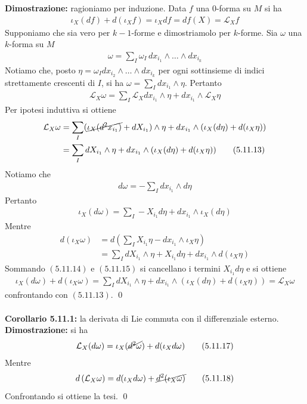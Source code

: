 \documentclass{article}
\begin{document}
\textbf{Dimostrazione:} ragioniamo per induzione. Data $f$ una $0$-forma su $M$ si ha
\begin{align*}
    \iota_X(df) + d(\iota_X f) = \iota_X df = df(X) = \mathcal{L}_X f \tag{5.11.11}
\end{align*}
Supponiamo che sia vero per $k - 1$-forme e dimostriamolo per $k$-forme. Sia $\omega$ una $k$-forma su $M$
\begin{align*}
    \omega = \sum_I \omega_I \, dx_{i_1} \wedge \dots \wedge dx_{i_k} 
\end{align*}
Notiamo che, posto $\eta = \omega_I dx_{i_2} \wedge \dots \wedge dx_{i_k}$ per ogni sottinsieme di indici strettamente crescenti di $I$, si ha $\omega = \sum_I dx_{i_1} \wedge \eta$. Pertanto
\begin{align*}
    \mathcal{L}_X \omega = \sum_I \mathcal{L}_X dx_{i_1} \wedge \eta + dx_{i_1} \wedge \mathcal{L}_X \eta \tag{5.11.12}
\end{align*}
Per ipotesi induttiva si ottiene
\begin{align*}
    \mathcal{L}_X \omega &= \sum_I (\cancel{\iota_X(d^2x_{i_1})} + dX_{i_1}) \wedge \eta + dx_{i_1} \wedge (\iota_X(d\eta) + d(\iota_X \eta)) \\
    &= \sum_I dX_{i_1} \wedge \eta + dx_{i_1} \wedge (\iota_X(d\eta) + d(\iota_X\eta)) \tag{5.11.13}
\end{align*}
Notiamo che
\begin{align*}
    d\omega = -\sum_I dx_{i_1} \wedge d\eta
\end{align*}
Pertanto
\begin{align*}
    \iota_X(d\omega) = \sum_I -X_{i_1}d\eta + dx_{i_1} \wedge \iota_X(d\eta) \tag{5.11.14}
\end{align*}
Mentre
\begin{align*}
    d(\iota_X \omega) &= d\left(\sum_I X_{i_1}\eta - dx_{i_1} \wedge \iota_X\eta\right) \\
    &= \sum_I dX_{i_1} \wedge \eta + X_{i_1}d\eta + dx_{i_1} \wedge d(\iota_X \eta) \tag{5.11.15}
\end{align*}
Sommando $(5.11.14)$ e $(5.11.15)$ si cancellano i termini $X_{i_1}d\eta$ e si ottiene
\begin{align}
    \iota_X(d\omega) + d(\iota_X\omega) = \sum_I dX_{i_1} \wedge \eta + dx_{i_1} \wedge (\iota_X(d\eta) + d(\iota_X\eta)) = \mathcal{L}_X\omega \tag{5.11.16}
\end{align}
confrontando con $(5.11.13)$. \qed \\ \\
\textbf{Corollario 5.11.1:} la derivata di Lie commuta con il differenziale esterno. \\

\textbf{Dimostrazione:} si ha
\begin{align*}
    \mathcal{L}_X(d\omega) = \iota_X(\cancel{d^2\omega}) + d(\iota_X d\omega) \tag{5.11.17}
\end{align*}
Mentre
\begin{align*}
    d\left(\mathcal{L}_X\omega\right) = d(\iota_X d\omega) + \cancel{d^2(\iota_X \omega)} \tag{5.11.18}
\end{align*}
Confrontando si ottiene la tesi. \qed
\end{document}
